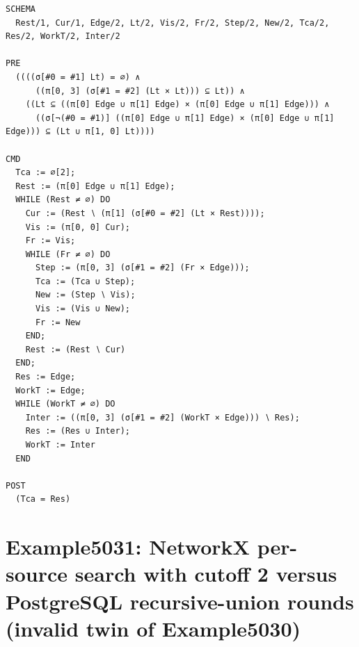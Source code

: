 \documentclass[10pt]{article}
\begin{document}
\begin{Verbatim}[fontsize=\tiny,breaklines=true,breakanywhere=true,frame=single,framesep=1.5mm]
SCHEMA
  Rest/1, Cur/1, Edge/2, Lt/2, Vis/2, Fr/2, Step/2, New/2, Tca/2, Res/2, WorkT/2, Inter/2

PRE
  ((((σ[#0 = #1] Lt) = ∅) ∧
      ((π[0, 3] (σ[#1 = #2] (Lt × Lt))) ⊆ Lt)) ∧
    ((Lt ⊆ ((π[0] Edge ∪ π[1] Edge) × (π[0] Edge ∪ π[1] Edge))) ∧
      ((σ[¬(#0 = #1)] ((π[0] Edge ∪ π[1] Edge) × (π[0] Edge ∪ π[1] Edge))) ⊆ (Lt ∪ π[1, 0] Lt))))

CMD
  Tca := ∅[2];
  Rest := (π[0] Edge ∪ π[1] Edge);
  WHILE (Rest ≠ ∅) DO
    Cur := (Rest ∖ (π[1] (σ[#0 = #2] (Lt × Rest))));
    Vis := (π[0, 0] Cur);
    Fr := Vis;
    WHILE (Fr ≠ ∅) DO
      Step := (π[0, 3] (σ[#1 = #2] (Fr × Edge)));
      Tca := (Tca ∪ Step);
      New := (Step ∖ Vis);
      Vis := (Vis ∪ New);
      Fr := New
    END;
    Rest := (Rest ∖ Cur)
  END;
  Res := Edge;
  WorkT := Edge;
  WHILE (WorkT ≠ ∅) DO
    Inter := ((π[0, 3] (σ[#1 = #2] (WorkT × Edge))) ∖ Res);
    Res := (Res ∪ Inter);
    WorkT := Inter
  END

POST
  (Tca = Res)
\end{Verbatim}

\Needspace{0.45\textheight}

\section{Example5031: NetworkX per-source search with cutoff 2 versus PostgreSQL recursive-union rounds (invalid twin of Example5030)}\label{case:Example5031}
\end{document}
